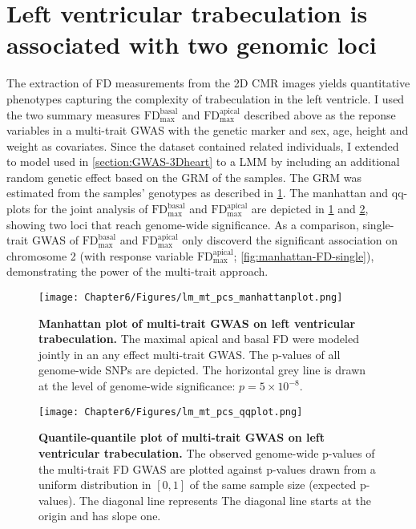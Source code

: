 \section{Left ventricular trabeculation is associated with two genomic loci}
The extraction of FD measurements from the 2D CMR images yields quantitative phenotypes capturing the complexity of trabeculation in the left ventricle. I used the two summary measures \(\text{FD}_\text{max}^\text{basal}\) and \(\text{FD}_\text{max}^\text{apical}\) described above as the reponse variables in a multi-trait GWAS with the genetic marker and sex, age, height and weight as covariates. Since the dataset contained related individuals, I extended to model used in \cref{section:GWAS-3Dheart} to a LMM by including an additional random genetic effect based on the GRM of the samples. The GRM was estimated from the samples' genotypes as described in \cref{}. The manhattan and qq-plots for the joint analysis of \(\text{FD}_\text{max}^\text{basal}\) and \(\text{FD}_\text{max}^\text{apical}\) are depicted in \cref{fig:manhattan-FD} and \cref{fig:qq-FD}, showing two loci that reach genome-wide significance. As a comparison, single-trait GWAS of  \(\text{FD}_\text{max}^\text{basal}\) and \(\text{FD}_\text{max}^\text{apical}\) only discoverd the significant association on chromosome 2 (with response variable \(\text{FD}_\text{max}^\text{apical}\); \cref{fig:manhattan-FD-single}), demonstrating the power of the multi-trait approach.

\begin{figure}[hbtp]
	\centering
	\texttt{[image: Chapter6/Figures/lm\_mt\_pcs\_manhattanplot.png]}
	\caption[\textbf{Manhattan plot of multi-trait GWAS on left ventricular trabeculation. }]{\textbf{Manhattan plot of multi-trait GWAS on left ventricular trabeculation. } The maximal apical and basal FD  were modeled jointly in an any effect multi-trait GWAS. The p-values of all genome-wide SNPs are depicted. The horizontal grey line is drawn at the level of genome-wide significance: \(p = 5 \times 10^{-8}\).} 
	 	\label{fig:manhattan-FD}
\end{figure}

\begin{figure}[hbtp]
	\centering
	\texttt{[image: Chapter6/Figures/lm\_mt\_pcs\_qqplot.png]}
	\caption[\textbf{Quantile-quantile plot of multi-trait GWAS on left ventricular trabeculation .}]{\textbf{Quantile-quantile plot of multi-trait GWAS on left ventricular trabeculation.} The observed genome-wide p-values of the multi-trait FD GWAS are plotted against p-values drawn from a uniform distribution in \([0,1]\) of the same sample size (expected p-values). The diagonal line represents The diagonal line starts at the origin and has slope one.} 
	 	\label{fig:qq-FD}
\end{figure}

